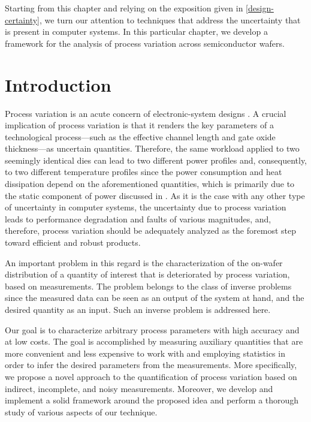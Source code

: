 Starting from this chapter and relying on the exposition given in
\cref{design-certainty}, we turn our attention to techniques that address the
uncertainty that is present in computer systems. In this particular chapter, we
develop a framework for the analysis of process variation across semiconductor
wafers.

\section{Introduction}

Process variation is an acute concern of electronic-system designs
\cite{chandrakasan2000, srivastava2010}. A crucial implication of process
variation is that it renders the key parameters of a technological
process---such as the effective channel length and gate oxide thickness---as
uncertain quantities. Therefore, the same workload applied to two seemingly
identical dies can lead to two different power profiles and, consequently, to
two different temperature profiles since the power consumption and heat
dissipation depend on the aforementioned quantities, which is primarily due to
the static component of power discussed in . As it is the
case with any other type of uncertainty in computer systems, the uncertainty due
to process variation leads to performance degradation and faults of various
magnitudes, and, therefore, process variation should be adequately analyzed as
the foremost step toward efficient and robust products.

An important problem in this regard is the characterization of the on-wafer
distribution of a quantity of interest that is deteriorated by process
variation, based on measurements. The problem belongs to the class of inverse
problems since the measured data can be seen as an output of the system at hand,
and the desired quantity as an input. Such an inverse problem is addressed here.

Our goal is to characterize arbitrary process parameters with high accuracy and
at low costs. The goal is accomplished by measuring auxiliary quantities that
are more convenient and less expensive to work with and employing statistics in
order to infer the desired parameters from the measurements. More specifically,
we propose a novel approach to the quantification of process variation based on
indirect, incomplete, and noisy measurements. Moreover, we develop and implement
a solid framework around the proposed idea and perform a thorough study of
various aspects of our technique.


